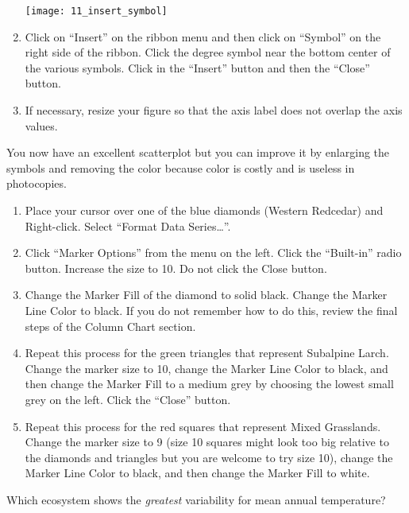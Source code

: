 \documentclass[12pt, hidelinks]{exam}
\begin{document}
\begin{questions}
\begin{enumerate}[resume]
\begin{center}
	\texttt{[image: 11\_insert\_symbol]}
\end{center}

	\item Click on “Insert” on the ribbon menu and then click on “Symbol” on the right side of the ribbon. Click the degree symbol near the bottom center of the various symbols. Click in the “Insert” button and then the “Close” button. 

	\item If necessary, resize your figure so that the axis label does not overlap the axis values.

\end{enumerate}

You now have an excellent scatterplot but you can improve it by enlarging the symbols and removing the color because  color is costly and is useless in photocopies.

\begin{enumerate}[resume]
	\item Place your cursor over one of the blue diamonds (Western Redcedar) and Right-click. Select “Format Data Series\dots”. 

	\item Click “Marker Options” from the menu on the left. Click the “Built-in” radio button. Increase the size to 10. Do not click the Close button.

	\item Change the Marker Fill of the diamond to solid black. Change the Marker Line Color to black. If you do not remember how to do this, review the final steps of the Column Chart section.

	\item Repeat this process for the green triangles that represent Subalpine Larch. Change the marker size to 10, change the Marker Line Color to black, and then change the Marker Fill to a medium grey by choosing the lowest small grey on the left. Click the “Close” button.

	\item Repeat this process for the red squares that represent Mixed Grasslands. Change the marker size to 9 (size 10 squares might look too big relative to the diamonds and triangles but you are welcome to try size 10), change the Marker Line Color to black, and then change the Marker Fill to white.
\end{enumerate}

\question
Which ecosystem shows the \emph{greatest} variability for mean annual temperature?


\end{questions}
\end{document}
